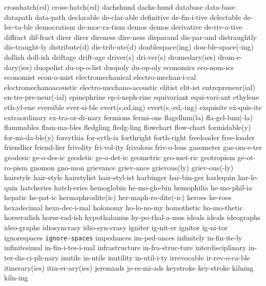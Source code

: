 \1 crosshatch(ed)	cross-hatch(ed)
\1 dachshund		dachs-hund
\1 database		data-base
\1 datapath		data-path
\1 declarable		de-clar-able
\1 definitive		de-fin-i-tive
\1 delectable		de-lec-ta-ble
\1 democratism		de-moc-ra-tism
\1 demos		demos	
\1 derivative		de-riv-a-tive
\1 diffract		dif-fract
\1 direr		direr
\1 direness		dire-ness
\1 disparand		dis-par-and
\1 distraughtly		dis-traught-ly
\1 distribute(d)	dis-trib-ute(d)
\1 doublespace(ing)	dou-ble-space(-ing)
\1 dollish		doll-ish
\1 driftage		drift-age
\1 driver(s)		dri-ver(s)
\1 dromedary(ies)	drom-e-dary(ies)
\1 duopolist		du-op-o-list
\1 duopoly		du-op-oly
\1 economics		eco-nom-ics
\1 economist		econ-o-mist
\1 electromechanical	electro-mechan-i-cal
\1 electromechanoacoustic  electro-mechano-acoustic
\1 elitist		elit-ist
\1 entrepreneur(ial)	en-tre-pre-neur(-ial)
\1 epinephrine		ep-i-neph-rine
\1 equivariant		equi-vari-ant
\1 ethylene		eth-yl-ene
\1 eversible		ever-si-ble
\1 evert(s,ed,ing)	evert(s,-ed,-ing)
\1 exquisite		ex-quis-ite
\1 extraordinary	ex-tra-or-di-nary
\1 fermions		fermi-ons
\1 flagellum(la)	fla-gel-lum(-la)
\1 flammables		flam-ma-bles
\1 fledgling		fledg-ling
\1 flowchart		flow-chart
\1 formidable(y)	for-mi-da-ble(y)
\1 forsythia		for-syth-ia
\1 forthright		forth-right
\1 freeloader		free-loader
\1 friendlier		friend-lier
\1 frivolity		fri-vol-ity
\1 frivolous		friv-o-lous
\1 gasometer		gas-om-e-ter
\1 geodesic		ge-o-des-ic
\1 geodetic		ge-o-det-ic
\1 geometric		geo-met-ric
\1 geotropism		ge-ot-ro-pism
\1 gnomon		gno-mon
\1 grievance		griev-ance
\1 grievous(ly) 	griev-ous(-ly) 
\1 hairstyle		hair-style
\1 hairstylist		hair-styl-ist
\1 harbinger		har-bin-ger
\1 harlequin		har-le-quin
\1 hatcheries		hatch-eries
\1 hemoglobin		he-mo-glo-bin
\1 hemophilia		he-mo-phil-ia
\1 hepatic		he-pat-ic
\1 hermaphrodite(ic)	her-maph-ro-dite(-ic)
\1 heroes		he-roes
\1 hexadecimal		hexa-dec-i-mal
\1 holonomy		ho-lo-no-my
\1 homothetic		ho-mo-thetic
\1 horseradish		horse-rad-ish
\1 hypothalamus 	hy-po-thal-a-mus 
\1 ideals		ideals
\1 ideographs		ideo-graphs
\1 idiosyncrasy 	idio-syn-crasy
\1 igniter		ig-nit-er
\1 ignitor		ig-ni-tor
\1 ignorespaces 	{\tt\bs ignore-spaces}
\1 impedances		im-ped-ances
\1 infinitely		in-fin-ite-ly
\1 infinitesimal	in-fin-i-tes-i-mal
\1 infrastructure	in-fra-struc-ture
\1 interdisciplinary	in-ter-dis-ci-pli-nary
\1 inutile		in-utile
\1 inutility		in-util-i-ty
\1 irrevocable		ir-rev-o-ca-ble
\1 itinerary(ies)	itin-er-ary(ies)
\1 jeremiads		je-re-mi-ads
\1 keystroke		key-stroke
\1 kilning		kiln-ing

